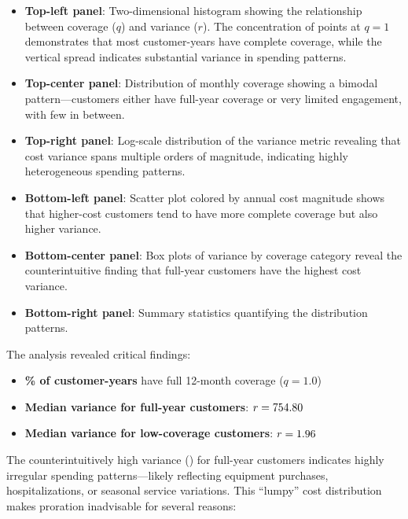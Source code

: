 \begin{itemize}
    \item \textbf{Top-left panel}: Two-dimensional histogram showing the relationship between coverage ($q$) and variance ($r$). The concentration of points at $q=1$ demonstrates that most customer-years have complete coverage, while the vertical spread indicates substantial variance in spending patterns.
    
    \item \textbf{Top-center panel}: Distribution of monthly coverage showing a bimodal pattern---customers either have full-year coverage or very limited engagement, with few in between.
    
    \item \textbf{Top-right panel}: Log-scale distribution of the variance metric revealing that cost variance spans multiple orders of magnitude, indicating highly heterogeneous spending patterns.
    
    \item \textbf{Bottom-left panel}: Scatter plot colored by annual cost magnitude shows that higher-cost customers tend to have more complete coverage but also higher variance.
    
    \item \textbf{Bottom-center panel}: Box plots of variance by coverage category reveal the counterintuitive finding that full-year customers have the highest cost variance.
    
    \item \textbf{Bottom-right panel}: Summary statistics quantifying the distribution patterns.
\end{itemize}

The analysis revealed critical findings:
\begin{itemize}
    \item \textbf{\ProrationFullYearPct\% of customer-years} have full 12-month coverage ($q = 1.0$)
    \item \textbf{Median variance for full-year customers}: $r = 754.80$
    \item \textbf{Median variance for low-coverage customers}: $r = 1.96$
\end{itemize}

The counterintuitively high variance (\ProrationMedianRFull) for full-year customers indicates highly irregular spending patterns---likely reflecting equipment purchases, hospitalizations, or seasonal service variations. This ``lumpy'' cost distribution makes proration inadvisable for several reasons:

